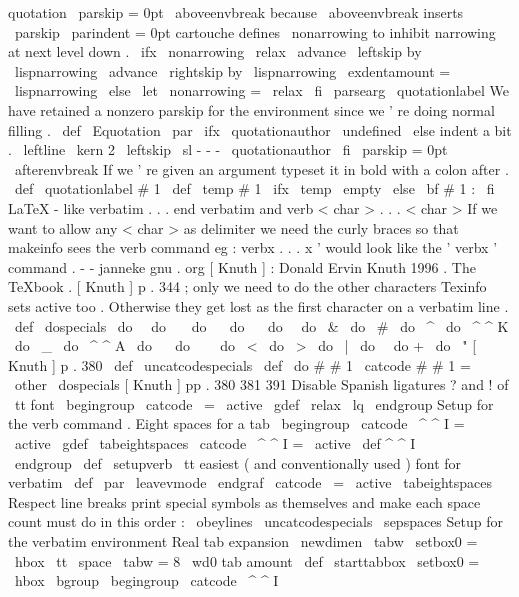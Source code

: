 {quotation
{
%
{
\
parskip
=
0pt
\
aboveenvbreak
}
%
because
\
aboveenvbreak
inserts
\
parskip
\
parindent
=
0pt
%
%
cartouche
defines
\
nonarrowing
to
inhibit
narrowing
at
next
level
down
.
\
ifx
\
nonarrowing
\
relax
\
advance
\
leftskip
by
\
lispnarrowing
\
advance
\
rightskip
by
\
lispnarrowing
\
exdentamount
=
\
lispnarrowing
\
else
\
let
\
nonarrowing
=
\
relax
\
fi
\
parsearg
\
quotationlabel
}
%
We
have
retained
a
nonzero
parskip
for
the
environment
since
we
'
re
%
doing
normal
filling
.
%
\
def
\
Equotation
{
%
\
par
\
ifx
\
quotationauthor
\
undefined
\
else
%
indent
a
bit
.
\
leftline
{
\
kern
2
\
leftskip
\
sl
-
-
-
\
quotationauthor
}
%
\
fi
{
\
parskip
=
0pt
\
afterenvbreak
}
%
}
%
If
we
'
re
given
an
argument
typeset
it
in
bold
with
a
colon
after
.
\
def
\
quotationlabel
#
1
{
%
\
def
\
temp
{
#
1
}
%
\
ifx
\
temp
\
empty
\
else
{
\
bf
#
1
:
}
%
\
fi
}
%
LaTeX
-
like
verbatim
.
.
.
end
verbatim
and
verb
{
<
char
>
.
.
.
<
char
>
}
%
If
we
want
to
allow
any
<
char
>
as
delimiter
%
we
need
the
curly
braces
so
that
makeinfo
sees
the
verb
command
eg
:
%
verbx
.
.
.
x
'
would
look
like
the
'
verbx
'
command
.
-
-
janneke
gnu
.
org
%
%
[
Knuth
]
:
Donald
Ervin
Knuth
1996
.
The
TeXbook
.
%
%
[
Knuth
]
p
.
344
;
only
we
need
to
do
the
other
characters
Texinfo
sets
%
active
too
.
Otherwise
they
get
lost
as
the
first
character
on
a
%
verbatim
line
.
\
def
\
dospecials
{
%
\
do
\
\
do
\
\
\
do
\
{
\
do
\
}
\
do
\
\
do
\
&
%
\
do
\
#
\
do
\
^
\
do
\
^
^
K
\
do
\
_
\
do
\
^
^
A
\
do
\
%
\
do
\
~
%
\
do
\
<
\
do
\
>
\
do
\
|
\
do
\
\
do
+
\
do
\
"
%
}
%
%
[
Knuth
]
p
.
380
\
def
\
uncatcodespecials
{
%
\
def
\
do
#
#
1
{
\
catcode
#
#
1
=
\
other
}
\
dospecials
}
%
%
[
Knuth
]
pp
.
380
381
391
%
Disable
Spanish
ligatures
?
and
!
of
\
tt
font
\
begingroup
\
catcode
\
=
\
active
\
gdef
{
\
relax
\
lq
}
\
endgroup
%
%
Setup
for
the
verb
command
.
%
%
Eight
spaces
for
a
tab
\
begingroup
\
catcode
\
^
^
I
=
\
active
\
gdef
\
tabeightspaces
{
\
catcode
\
^
^
I
=
\
active
\
def
^
^
I
{
\
\
\
\
\
\
\
\
}
}
\
endgroup
%
\
def
\
setupverb
{
%
\
tt
%
easiest
(
and
conventionally
used
)
font
for
verbatim
\
def
\
par
{
\
leavevmode
\
endgraf
}
%
\
catcode
\
=
\
active
\
tabeightspaces
%
Respect
line
breaks
%
print
special
symbols
as
themselves
and
%
make
each
space
count
%
must
do
in
this
order
:
\
obeylines
\
uncatcodespecials
\
sepspaces
}
%
Setup
for
the
verbatim
environment
%
%
Real
tab
expansion
\
newdimen
\
tabw
\
setbox0
=
\
hbox
{
\
tt
\
space
}
\
tabw
=
8
\
wd0
%
tab
amount
%
\
def
\
starttabbox
{
\
setbox0
=
\
hbox
\
bgroup
}
\
begingroup
\
catcode
\
^
^
I
}
